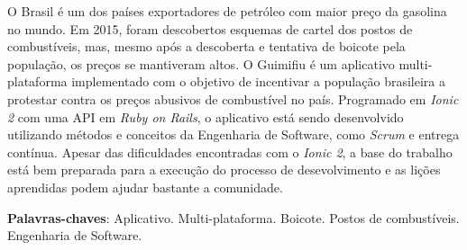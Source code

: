 \begin{resumo}

O Brasil é um dos países exportadores de petróleo com maior preço da gasolina no mundo. Em 2015, foram descobertos esquemas de cartel dos postos de combustíveis, mas, mesmo após a descoberta e tentativa de boicote pela população, os preços se mantiveram altos. O Guimifiu é um aplicativo multi-plataforma implementado com o objetivo de incentivar a população brasileira a protestar contra os preços abusivos de combustível no país. Programado em \textit{Ionic 2} com uma API em \textit{Ruby on Rails}, o aplicativo está sendo desenvolvido utilizando métodos e conceitos da Engenharia de Software, como \textit{Scrum} e entrega contínua. Apesar das dificuldades encontradas com o \textit{Ionic 2}, a base do trabalho está bem preparada para a execução do processo de desevolvimento e as lições aprendidas podem ajudar bastante a comunidade.

 \vspace{\onelineskip}

 \noindent
 \textbf{Palavras-chaves}: Aplicativo. Multi-plataforma. Boicote. Postos de combustíveis. Engenharia de Software. 
\end{resumo}
